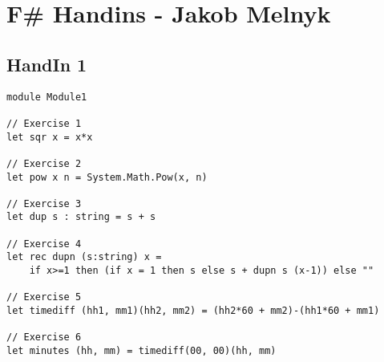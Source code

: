 \section{F\# Handins - Jakob Melnyk}
\label{Appendix_FSharp_Melnyk}

\subsection{HandIn 1}
\label{Appendix_FSharp_Melnyk_1}
\begin{lstlisting}
module Module1

// Exercise 1
let sqr x = x*x

// Exercise 2
let pow x n = System.Math.Pow(x, n)

// Exercise 3
let dup s : string = s + s

// Exercise 4
let rec dupn (s:string) x = 
	if x>=1 then (if x = 1 then s else s + dupn s (x-1)) else ""

// Exercise 5
let timediff (hh1, mm1)(hh2, mm2) = (hh2*60 + mm2)-(hh1*60 + mm1)

// Exercise 6
let minutes (hh, mm) = timediff(00, 00)(hh, mm)
\end{lstlisting}
